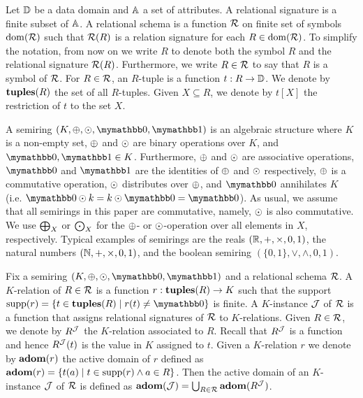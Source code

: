 Let $\mathbb{D}$ be a data domain and $\mathbb{A}$ a set of attributes. A relational signature is a finite subset of $\mathbb{A}$. A relational schema is a function $\mathcal{R}$ on finite set of symbols $\operatorname{dom}(\mathcal{R})$ such that $\mathcal{R}(R)$ is a relation signature for each $R \in \operatorname{dom}(\mathcal{R})$. To simplify the notation, from now on we write $R$ to denote both the symbol $R$ and the relational signature $\mathcal{R}(R)$.
Furthermore, we write $R \in \mathcal{R}$ to say that $R$ is a symbol of $\mathcal{R}$. 
For $R \in \mathcal{R}$, an $R$-tuple is a function $t: R \rightarrow \mathbb{D}$. We denote by $\mathbf{tuples}(R)$ the set of all $R$-tuples. Given $X \subseteq R$, we denote by $t[X]$ the restriction of $t$ to the set $X$.

A semiring $(K, \ksum, \kprod, \kzero, \kone)$ is an algebraic structure where $K$ is a non-empty set, $\oplus$ and $\odot$ are binary operations over $K$, and $\kzero, \kone \in K$. Furthermore,  $\oplus$ and $\odot$ are associative operations, $\kzero$ and $\kone$ are the identities of $\oplus$ and $\odot$ respectively, $\oplus$ is a commutative operation, $\odot$ distributes over $\oplus$, and $\kzero$ annihilates $K$ (i.e. $\kzero \kprod k = k \kprod \kzero = \kzero$). As usual, we assume that all semirings in this paper are commutative, namely, $\odot$ is also commutative. We use $\bigoplus_X$ or $\bigodot_X$ for the $\oplus$- or $\odot$-operation over all elements in $X$, respectively. Typical examples of semirings are the reals $(\mathbb{R}, +, \times, 0,1)$, the natural numbers $(\mathbb{N}, +, \times, 0,1)$, and the boolean semiring $(\{0,1\}, \vee, \wedge, 0, 1)$. 

Fix a semiring $(K, \ksum, \kprod, \kzero, \kone)$ and a relational schema $\mathcal{R}$. A $K$-relation of $R \in \mathcal{R}$ is a function $r: \mathbf{tuples}(R) \rightarrow K$ such that the support  $\supp(r) = \{t \in \tuples(R) \mid r(t) \neq \kzero\}$ is finite. 
A $K$-instance $\mathcal{J}$ of $\mathcal{R}$ is a function that assigns relational signatures of $\mathcal{R}$ to $K$-relations. Given $R \in \mathcal{R}$, we denote by $R^{\mathcal{J}}$ the $K$-relation associated to $R$. Recall that $R^{\mathcal{J}}$ is a function and hence  $R^{\mathcal{J}}(t)$ is the value in $K$ assigned to $t$. 
Given a $K$-relation $r$ we denote by $\mathbf{adom}(r)$ the active domain of $r$ defined as $\mathbf{adom}(r) = \{t(a) \mid t \in \operatorname{supp}(r) \wedge a \in R\}$.
Then the active domain of an $K$-instance $\mathcal{J}$ of $\mathcal{R}$ is defined as $\mathbf{adom}(\mathcal{J}) = \bigcup_{R \in \mathcal{R}} \mathbf{adom}(R^{\mathcal{J}})$. 


